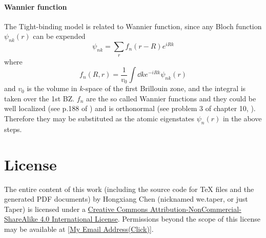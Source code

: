 \documentclass{article}
\begin{document}
\paragraph{Wannier function} The Tight-binding model is related to
Wannier function, since any Bloch function $\psi_{nk}(r)$ can be
expended
\begin{equation}
    \psi_{nk} = \sum_r f_n(r-R) e^{iRk}
\end{equation}
where
\begin{equation}
    f_n(R,r) = \frac{1}{v_0} \int\dd{k}e^{-iRk}\psi_{nk}(r)
\end{equation}
and $v_0$ is the volume in $k$-space of the first Brillouin zone, and
the integral is taken over the 1st BZ. $f_n$ are the so called Wannier
functions and they could be well localized (see p.188 of
\cite{Ashcroft1976}) and is orthonormal (see problem 3 of chapter 10,
\cite{Ashcroft1976}). Therefore they may be substituted as the atomic
eigenstates $\psi_n(r)$ in the above steps.   %

{}


\printnomenclature
\section{License}
The entire content of this work (including the source code
for TeX files and the generated PDF documents) by 
Hongxiang Chen (nicknamed we.taper, or just Taper) is
licensed under a 
\href{http://creativecommons.org/licenses/by-nc-sa/4.0/}{Creative 
Commons Attribution-NonCommercial-ShareAlike 4.0 International 
License}. Permissions beyond the scope of this 
license may be available at 
\href{http://www.google.com/recaptcha/mailhide/d?k=015LguzBJigi0rpyuJRqLoig==\&c=p1c-M-mm7ZcjUCkTuZZa9eEPHRVk6paN0694iazlQy8=}
{[My Email Address(Click)]}.
\end{document}
